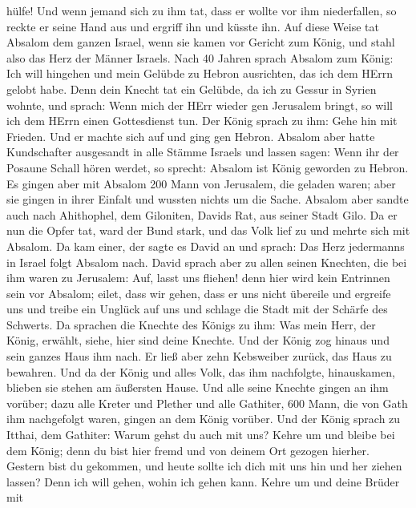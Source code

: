 hülfe!  Und wenn jemand sich zu ihm tat, dass er wollte vor
ihm niederfallen, so reckte er seine Hand aus und ergriff ihn und küsste
ihn.  Auf diese Weise tat Absalom dem ganzen Israel, wenn
sie kamen vor Gericht zum König, und stahl also das Herz der Männer
Israels.  Nach 40 Jahren sprach Absalom zum König: Ich will
hingehen und mein Gelübde zu Hebron ausrichten, das ich dem HErrn gelobt
habe.  Denn dein Knecht tat ein Gelübde, da ich zu Gessur in
Syrien wohnte, und sprach: Wenn mich der HErr wieder gen Jerusalem
bringt, so will ich dem HErrn einen Gottesdienst tun.  Der
König sprach zu ihm: Gehe hin mit Frieden. Und er machte sich auf und
ging gen Hebron.  Absalom aber hatte Kundschafter
ausgesandt in alle Stämme Israels und lassen sagen: Wenn ihr der Posaune
Schall hören werdet, so sprecht: Absalom ist König geworden zu Hebron.
 Es gingen aber mit Absalom 200 Mann von Jerusalem, die
geladen waren; aber sie gingen in ihrer Einfalt und wussten nichts um
die Sache.  Absalom aber sandte auch nach Ahithophel, dem
Giloniten, Davids Rat, aus seiner Stadt Gilo. Da er nun die Opfer tat,
ward der Bund stark, und das Volk lief zu und mehrte sich mit Absalom.
 Da kam einer, der sagte es David an und sprach: Das Herz
jedermanns in Israel folgt Absalom nach.  David sprach aber
zu allen seinen Knechten, die bei ihm waren zu Jerusalem: Auf, lasst uns
fliehen! denn hier wird kein Entrinnen sein vor Absalom; eilet, dass wir
gehen, dass er uns nicht übereile und ergreife uns und treibe ein
Unglück auf uns und schlage die Stadt mit der Schärfe des Schwerts.
 Da sprachen die Knechte des Königs zu ihm: Was mein Herr,
der König, erwählt, siehe, hier sind deine Knechte.  Und
der König zog hinaus und sein ganzes Haus ihm nach. Er ließ aber zehn
Kebsweiber zurück, das Haus zu bewahren.  Und da der König
und alles Volk, das ihm nachfolgte, hinauskamen, blieben sie stehen am
äußersten Hause.  Und alle seine Knechte gingen an ihm
vorüber; dazu alle Kreter und Plether und alle Gathiter, 600 Mann, die
von Gath ihm nachgefolgt waren, gingen an dem König vorüber.
 Und der König sprach zu Itthai, dem Gathiter: Warum gehst
du auch mit uns? Kehre um und bleibe bei dem König; denn du bist hier
fremd und von deinem Ort gezogen hierher.  Gestern bist du
gekommen, und heute sollte ich dich mit uns hin und her ziehen lassen?
Denn ich will gehen, wohin ich gehen kann. Kehre um und deine Brüder mit
